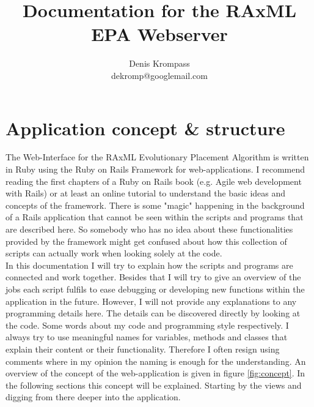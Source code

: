 \documentclass{scrartcl}
\begin{document}
\title{Documentation for the RAxML EPA Webserver}
\author{Denis Krompass\\ dekromp@googlemail.com}
\maketitle

\tableofcontents
	\section{Application concept \& structure }
		The Web-Interface for the RAxML Evolutionary Placement Algorithm is written in Ruby using the Ruby on Rails Framework for web-applications. I recommend reading the first chapters of a Ruby on Rails book (e.g. Agile web development with Rails) or at least an online tutorial to understand the basic ideas and concepts of  the framework. There is some "magic" happening in the background of a Rails application that cannot be seen within the scripts and programs that are described here. So somebody who has no idea about these functionalities provided by the framework might get confused about how this collection of scripts can actually work when looking solely at the code.  \\
		In this documentation I will try to explain how the scripts and programs are connected  and work together. Besides that I will try to give an overview of the jobs each script fulfils to ease debugging or developing new functions within the application in the future. However, I will not provide any explanations to any programming details here. The details can be discovered directly by looking at the code. Some words about my code and programming style respectively. I always try to use meaningful names for variables, methods and classes that explain their content or their functionality. Therefore I often resign using comments where in my opinion the naming is enough for the  understanding. An overview of the concept of the web-application is given in figure \ref{fig:concept}. In the following sections this concept will be explained. Starting by the views and digging from there deeper into the application.
		
\end{document}
